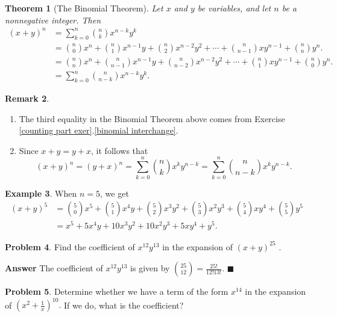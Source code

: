 \documentclass[12pt,letterpaper]{book}
\numberwithin{equation}{section}
\newtheorem{thm}{\textbf{Theorem}}[section]
\theoremstyle{definition}
\newtheorem{problem}[thm]{\textbf{Problem}}
\newtheorem{example}[thm]{\textbf{Example}}
\newtheorem{remark}[thm]{\textbf{Remark}}
\newenvironment{answer}{\noindent\textbf{Answer}}{\hfill$\blacksquare$\vspace{0.1in}}
\begin{document}
\begin{thm}[The Binomial Theorem] Let $x$ and $y$ be variables, and let $n$ be a nonnegative integer. Then
\begin{align*}
(x+y)^n&=\sum_{k=0}^n {n\choose k} x^{n-k}y^k\\
&={n\choose 0} x^n + {n\choose 1} x^{n-1}y + {n \choose 2} x^{n-2}y^2
+\cdots +{n\choose n-1} xy^{n-1} + {n\choose n} y^n.\\
&={n\choose n} x^n + {n\choose n-1} x^{n-1}y + {n \choose n-2} x^{n-2}y^2
+\cdots +{n\choose 1} xy^{n-1} + {n\choose 0} y^n.\\
&=\sum_{k=0}^n {n\choose n-k} x^{n-k}y^k.
\end{align*}
\end{thm}

\begin{remark} \quad
\begin{enumerate}
\item The third equality in the Binomial Theorem above comes from Exercise \ref{counting part exer}.\ref{binomial interchange}.
\item Since $x+y=y+x$, it follows that
$$(x+y)^n=(y+x)^n=\sum_{k=0}^n {n\choose k} x^ky^{n-k}=\sum_{k=0}^n {n\choose n-k} x^ky^{n-k}.$$
\end{enumerate}
\end{remark}

\begin{example} When $n=5$, we get
\begin{align*}(x+y)^5&={5\choose 0}x^5+{5\choose 1}x^4y+{5\choose 2}x^3y^2+{5\choose 3}x^2y^3+{5\choose 4}xy^4+{5\choose 5}y^5\\
&=x^5+5x^4y+10x^3y^2+10x^2y^3+5xy^4+y^5.
\end{align*}
\end{example}

\begin{problem} Find the coefficient of $x^{12}y^{13}$ in the expansion of $(x+y)^{25}$ .
\end{problem}

\begin{answer}
The coefficient of $x^{12}y^{13}$ is given by ${25\choose 12}=\frac{25!}{12!13!}$.
\end{answer}

\begin{problem} Determine whether we have a term of the form $x^{14}$ in the expansion of $\left(x^2+\frac{1}{x}\right)^{10}.$ If we do, what is the coefficient?
\end{problem}
\end{document}
